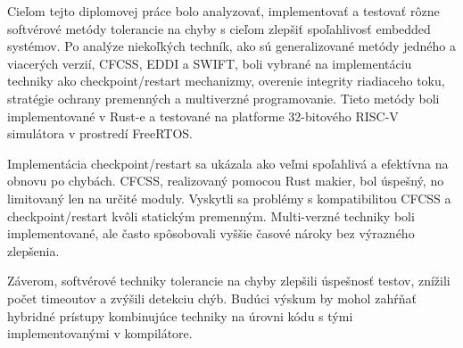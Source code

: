 \documentclass[12pt, letterpaper]{article}
\begin{document}
Cieľom tejto diplomovej práce bolo analyzovať, implementovať a testovať rôzne softvérové metódy tolerancie na chyby s cieľom zlepšiť spoľahlivosť embedded systémov. Po analýze niekoľkých techník, ako sú generalizované metódy jedného a viacerých verzií, CFCSS, EDDI a SWIFT, boli vybrané na implementáciu techniky ako checkpoint/restart mechanizmy, overenie integrity riadiaceho toku, stratégie ochrany premenných a multiverzné programovanie. Tieto metódy boli implementované v Rust-e a testované na platforme 32-bitového RISC-V simulátora v prostredí FreeRTOS.

Implementácia checkpoint/restart sa ukázala ako veľmi spoľahlivá a efektívna na obnovu po chybách. CFCSS, realizovaný pomocou Rust makier, bol úspešný, no limitovaný len na určité moduly. Vyskytli sa problémy s kompatibilitou CFCSS a checkpoint/restart kvôli statickým premenným. Multi-verzné techniky boli implementované, ale často spôsobovali vyššie časové nároky bez výrazného zlepšenia.

Záverom, softvérové techniky tolerancie na chyby zlepšili úspešnosť testov, znížili počet timeoutov a zvýšili detekciu chýb. Budúci výskum by mohol zahŕňať hybridné prístupy kombinujúce techniky na úrovni kódu s tými implementovanými v kompilátore.



\newpage
\printbibliography

\clearpage
\end{document}
